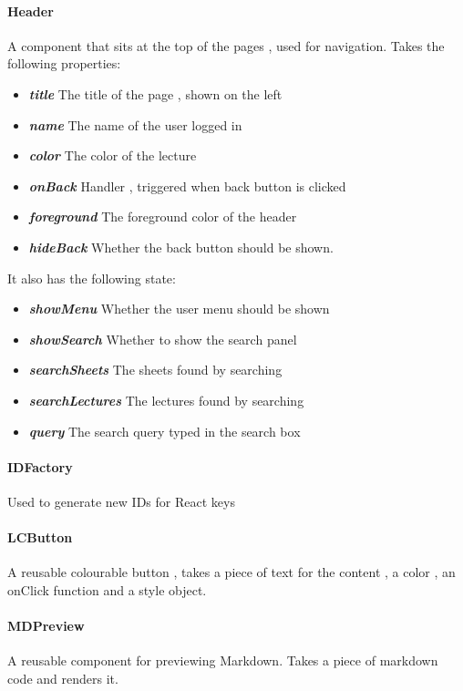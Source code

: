 \paragraph{Header} A component that sits at the top of the pages , used for navigation. Takes the following properties:
\begin{itemize}
	\item \textit{\textbf{title}} The title of the page , shown on the left
	\item \textit{\textbf{name}} The name of the user logged in
	\item \textit{\textbf{color}} The color of the lecture
	\item \textit{\textbf{onBack}} Handler , triggered when back button is clicked
	\item \textit{\textbf{foreground}} The foreground color of the header
	\item \textit{\textbf{hideBack}} Whether the back button should be shown.
\end{itemize}
It also has the following state:
\begin{itemize}
	\item \textit{\textbf{showMenu}} Whether the user menu should be shown
	\item \textit{\textbf{showSearch}} Whether to show the search panel
	\item \textit{\textbf{searchSheets}} The sheets found by searching
	\item \textit{\textbf{searchLectures}} The lectures found by searching
	\item \textit{\textbf{query}} The search query typed in the search box
\end{itemize}
\paragraph{IDFactory} Used to generate new IDs for React keys
\paragraph{LCButton} A reusable colourable button , takes a piece of text for the content , a color , an onClick function and a style object.
\paragraph{MDPreview} A reusable component for previewing Markdown. Takes a piece of markdown code and renders it.
